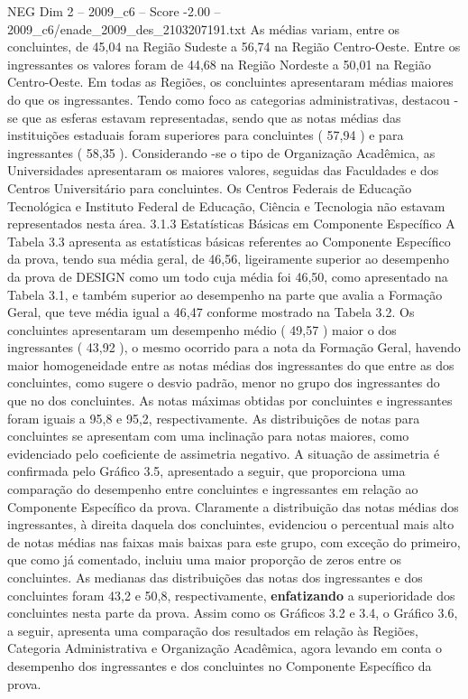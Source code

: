 \begin{textsample}{NEG Dim 2 – 2009\_c6 – Score -2.00 – 2009\_c6/enade\_2009\_des\_2103207191.txt}
As médias variam, entre os concluintes, de 45,04 na Região Sudeste a 56,74 na Região Centro-Oeste.
Entre os ingressantes os valores foram de 44,68 na Região Nordeste a 50,01 na Região Centro-Oeste.
Em todas as Regiões, os concluintes apresentaram médias maiores do que os ingressantes.
Tendo como foco as categorias administrativas, destacou -se que as esferas estavam representadas, sendo que as notas médias das instituições estaduais foram superiores para concluintes ( 57,94 ) e para ingressantes ( 58,35 ).
Considerando -se o tipo de Organização Acadêmica, as Universidades apresentaram os maiores valores, seguidas das Faculdades e dos Centros Universitário para concluintes.
Os Centros Federais de Educação Tecnológica e Instituto Federal de Educação, Ciência e Tecnologia não estavam representados nesta área. 3.1.3 Estatísticas Básicas em Componente Específico A Tabela 3.3 apresenta as estatísticas básicas referentes ao Componente Específico da prova, tendo sua média geral, de 46,56, ligeiramente superior ao desempenho da prova de DESIGN como um todo cuja média foi 46,50, como apresentado na Tabela 3.1, e também superior ao desempenho na parte que avalia a Formação Geral, que teve média igual a 46,47 conforme mostrado na Tabela 3.2.
Os concluintes apresentaram um desempenho médio ( 49,57 ) maior o dos ingressantes ( 43,92 ), o mesmo ocorrido para a nota da Formação Geral, havendo maior homogeneidade entre as notas médias dos ingressantes do que entre as dos concluintes, como sugere o desvio padrão, menor no grupo dos ingressantes do que no dos concluintes.
As notas máximas obtidas por concluintes e ingressantes foram iguais a 95,8 e 95,2, respectivamente.
As distribuições de notas para concluintes se apresentam com uma inclinação para notas maiores, como evidenciado pelo coeficiente de assimetria negativo.
A situação de assimetria é confirmada pelo Gráfico 3.5, apresentado a seguir, que proporciona uma comparação do desempenho entre concluintes e ingressantes em relação ao Componente Específico da prova.
Claramente a distribuição das notas médias dos ingressantes, à direita daquela dos concluintes, evidenciou o percentual mais alto de notas médias nas faixas mais baixas para este grupo, com exceção do primeiro, que como já comentado, incluiu uma maior proporção de zeros entre os concluintes.
As medianas das distribuições das notas dos ingressantes e dos concluintes foram 43,2 e 50,8, respectivamente, \textbf{enfatizando} a superioridade dos concluintes nesta parte da prova.
Assim como os Gráficos 3.2 e 3.4, o Gráfico 3.6, a seguir, apresenta uma comparação dos resultados em relação às Regiões, Categoria Administrativa e Organização Acadêmica, agora levando em conta o desempenho dos ingressantes e dos concluintes no Componente Específico da prova.

\end{textsample}
